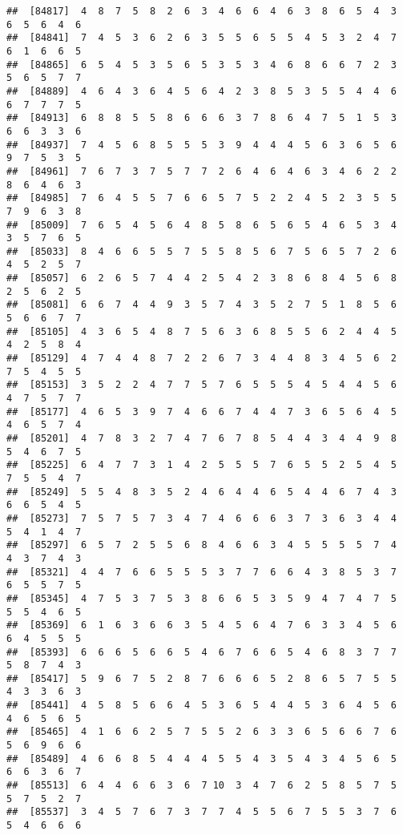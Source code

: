 \documentclass[
]{book}
\begin{document}
\begin{verbatim}
##  [84817]  4  8  7  5  8  2  6  3  4  6  6  4  6  3  8  6  5  4  3  6  5  6  4  6
##  [84841]  7  4  5  3  6  2  6  3  5  5  6  5  5  4  5  3  2  4  7  6  1  6  6  5
##  [84865]  6  5  4  5  3  5  6  5  3  5  3  4  6  8  6  6  7  2  3  5  6  5  7  7
##  [84889]  4  6  4  3  6  4  5  6  4  2  3  8  5  3  5  5  4  4  6  6  7  7  7  5
##  [84913]  6  8  8  5  5  8  6  6  6  3  7  8  6  4  7  5  1  5  3  6  6  3  3  6
##  [84937]  7  4  5  6  8  5  5  5  3  9  4  4  4  5  6  3  6  5  6  9  7  5  3  5
##  [84961]  7  6  7  3  7  5  7  7  2  6  4  6  4  6  3  4  6  2  2  8  6  4  6  3
##  [84985]  7  6  4  5  5  7  6  6  5  7  5  2  2  4  5  2  3  5  5  7  9  6  3  8
##  [85009]  7  6  5  4  5  6  4  8  5  8  6  5  6  5  4  6  5  3  4  3  5  7  6  5
##  [85033]  8  4  6  6  5  5  7  5  5  8  5  6  7  5  6  5  7  2  6  4  5  2  5  7
##  [85057]  6  2  6  5  7  4  4  2  5  4  2  3  8  6  8  4  5  6  8  2  5  6  2  5
##  [85081]  6  6  7  4  4  9  3  5  7  4  3  5  2  7  5  1  8  5  6  5  6  6  7  7
##  [85105]  4  3  6  5  4  8  7  5  6  3  6  8  5  5  6  2  4  4  5  4  2  5  8  4
##  [85129]  4  7  4  4  8  7  2  2  6  7  3  4  4  8  3  4  5  6  2  7  5  4  5  5
##  [85153]  3  5  2  2  4  7  7  5  7  6  5  5  5  4  5  4  4  5  6  4  7  5  7  7
##  [85177]  4  6  5  3  9  7  4  6  6  7  4  4  7  3  6  5  6  4  5  4  6  5  7  4
##  [85201]  4  7  8  3  2  7  4  7  6  7  8  5  4  4  3  4  4  9  8  5  4  6  7  5
##  [85225]  6  4  7  7  3  1  4  2  5  5  5  7  6  5  5  2  5  4  5  7  5  5  4  7
##  [85249]  5  5  4  8  3  5  2  4  6  4  4  6  5  4  4  6  7  4  3  6  6  5  4  5
##  [85273]  7  5  7  5  7  3  4  7  4  6  6  6  3  7  3  6  3  4  4  5  4  1  4  7
##  [85297]  6  5  7  2  5  5  6  8  4  6  6  3  4  5  5  5  5  7  4  4  3  7  4  3
##  [85321]  4  4  7  6  6  5  5  5  3  7  7  6  6  4  3  8  5  3  7  6  5  5  7  5
##  [85345]  4  7  5  3  7  5  3  8  6  6  5  3  5  9  4  7  4  7  5  5  5  4  6  5
##  [85369]  6  1  6  3  6  6  3  5  4  5  6  4  7  6  3  3  4  5  6  6  4  5  5  5
##  [85393]  6  6  6  5  6  6  5  4  6  7  6  6  5  4  6  8  3  7  7  5  8  7  4  3
##  [85417]  5  9  6  7  5  2  8  7  6  6  6  5  2  8  6  5  7  5  5  4  3  3  6  3
##  [85441]  4  5  8  5  6  6  4  5  3  6  5  4  4  5  3  6  4  5  6  4  6  5  6  5
##  [85465]  4  1  6  6  2  5  7  5  5  2  6  3  3  6  5  6  6  7  6  5  6  9  6  6
##  [85489]  4  6  6  8  5  4  4  4  5  5  4  3  5  4  3  4  5  6  5  6  6  3  6  7
##  [85513]  6  4  4  6  6  3  6  7 10  3  4  7  6  2  5  8  5  7  5  5  7  5  2  7
##  [85537]  3  4  5  7  6  7  3  7  7  4  5  5  6  7  5  5  3  7  6  5  4  6  6  6

\end{verbatim}
\end{document}
